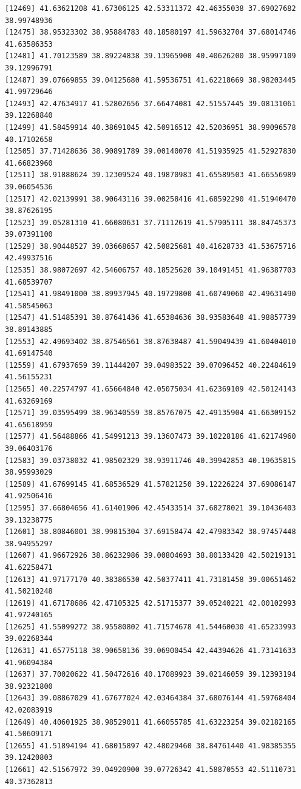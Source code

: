 \documentclass[
  letterpaper,
  DIV=11,
  numbers=noendperiod]{scrartcl}
\begin{document}
\begin{verbatim}
[12469] 41.63621208 41.67306125 42.53311372 42.46355038 37.69027682 38.99748936
[12475] 38.95323302 38.95884783 40.18580197 41.59632704 37.68014746 41.63586353
[12481] 41.70123589 38.89224838 39.13965900 40.40626200 38.95997109 39.12996791
[12487] 39.07669855 39.04125680 41.59536751 41.62218669 38.98203445 41.99729646
[12493] 42.47634917 41.52802656 37.66474081 42.51557445 39.08131061 39.12268840
[12499] 41.58459914 40.38691045 42.50916512 42.52036951 38.99096578 40.17102658
[12505] 37.71428636 38.90891789 39.00140070 41.51935925 41.52927830 41.66823960
[12511] 38.91888624 39.12309524 40.19870983 41.65589503 41.66556989 39.06054536
[12517] 42.02139991 38.90643116 39.00258416 41.68592290 41.51940470 38.87626195
[12523] 39.05281310 41.66080631 37.71112619 41.57905111 38.84745373 39.07391100
[12529] 38.90448527 39.03668657 42.50825681 40.41628733 41.53675716 42.49937516
[12535] 38.98072697 42.54606757 40.18525620 39.10491451 41.96387703 41.68539707
[12541] 41.98491000 38.89937945 40.19729800 41.60749060 42.49631490 41.58545063
[12547] 41.51485391 38.87641436 41.65384636 38.93583648 41.98857739 38.89143885
[12553] 42.49693402 38.87546561 38.87638487 41.59049439 41.60404010 41.69147540
[12559] 41.67937659 39.11444207 39.04983522 39.07096452 40.22484619 41.56155231
[12565] 40.22574797 41.65664840 42.05075034 41.62369109 42.50124143 41.63269169
[12571] 39.03595499 38.96340559 38.85767075 42.49135904 41.66309152 41.65618959
[12577] 41.56488866 41.54991213 39.13607473 39.10228186 41.62174960 39.06403176
[12583] 39.03738032 41.98502329 38.93911746 40.39942853 40.19635815 38.95993029
[12589] 41.67699145 41.68536529 41.57821250 39.12226224 37.69086147 41.92506416
[12595] 37.66804656 41.61401906 42.45433514 37.68278021 39.10436403 39.13238775
[12601] 38.80846001 38.99815304 37.69158474 42.47983342 38.97457448 38.94955297
[12607] 41.96672926 38.86232986 39.00804693 38.80133428 42.50219131 41.62258471
[12613] 41.97177170 40.38386530 42.50377411 41.73181458 39.00651462 41.50210248
[12619] 41.67178686 42.47105325 42.51715377 39.05240221 42.00102993 41.97240165
[12625] 41.55099272 38.95580802 41.71574678 41.54460030 41.65233993 39.02268344
[12631] 41.65775118 38.90658136 39.06900454 42.44394626 41.73141633 41.96094384
[12637] 37.70020622 41.50472616 40.17089923 39.02146059 39.12393194 38.92321800
[12643] 39.08867029 41.67677024 42.03464384 37.68076144 41.59768404 42.02083919
[12649] 40.40601925 38.98529011 41.66055785 41.63223254 39.02182165 41.50609171
[12655] 41.51894194 41.68015897 42.48029460 38.84761440 41.98385355 39.12420803
[12661] 42.51567972 39.04920900 39.07726342 41.58870553 42.51110731 40.37362813

\end{verbatim}
\end{document}
